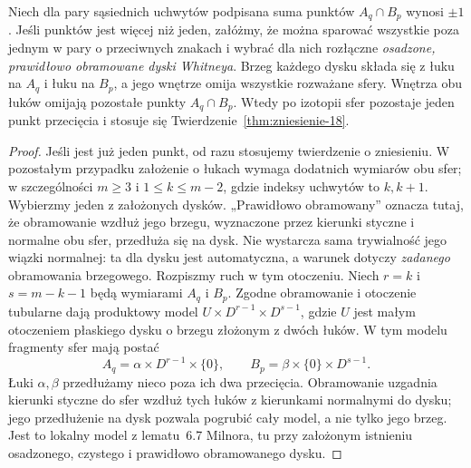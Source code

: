 \begin{stwierdzenie}
\label{prop:whitney-do-zniesienia-18}
Niech dla pary sąsiednich uchwytów
podpisana suma punktów $A_q\cap B_p$
wynosi $\pm1$. Jeśli punktów jest więcej niż jeden,
załóżmy, że można sparować wszystkie poza jednym
w pary o przeciwnych znakach i wybrać dla nich
rozłączne \emph{osadzone, prawidłowo obramowane
dyski Whitneya}. Brzeg każdego dysku składa się
z łuku na $A_q$ i łuku na $B_p$, a jego wnętrze
omija wszystkie rozważane sfery. Wnętrza obu łuków
omijają pozostałe punkty $A_q\cap B_p$.
Wtedy po izotopii sfer
pozostaje jeden punkt przecięcia
i stosuje się
Twierdzenie~\ref{thm:zniesienie-18}.
\end{stwierdzenie}
\begin{proof}
Jeśli jest już jeden punkt, od razu stosujemy
twierdzenie o zniesieniu. W pozostałym przypadku
założenie o łukach wymaga dodatnich wymiarów obu sfer;
w szczególności $m\geq3$ i $1\leq k\leq m-2$,
gdzie indeksy uchwytów to $k,k+1$.
Wybierzmy jeden z założonych dysków.
„Prawidłowo obramowany” oznacza tutaj, że obramowanie
wzdłuż jego brzegu, wyznaczone przez kierunki
styczne i normalne obu sfer, przedłuża się na dysk.
Nie wystarcza sama trywialność jego wiązki normalnej:
ta dla dysku jest automatyczna, a warunek dotyczy
\emph{zadanego} obramowania brzegowego.
Rozpiszmy ruch w tym otoczeniu. Niech $r=k$ i $s=m-k-1$
będą wymiarami $A_q$ i $B_p$. Zgodne obramowanie i otoczenie
tubularne dają produktowy model
$U\times D^{r-1}\times D^{s-1}$, gdzie $U$ jest małym
otoczeniem płaskiego dysku o brzegu złożonym z dwóch łuków.
W tym modelu fragmenty sfer mają postać
\[
 A_q=\alpha\times D^{r-1}\times\{0\},\qquad
 B_p=\beta\times\{0\}\times D^{s-1}.
\]
Łuki $\alpha,\beta$ przedłużamy nieco poza ich dwa przecięcia.
Obramowanie uzgadnia kierunki styczne do sfer wzdłuż tych łuków
z kierunkami normalnymi do dysku; jego przedłużenie na dysk
pozwala pogrubić cały model, a nie tylko jego brzeg.
Jest to lokalny model z lematu~6.7 Milnora, tu przy założonym
istnieniu osadzonego, czystego i prawidłowo obramowanego dysku.


\end{proof}
